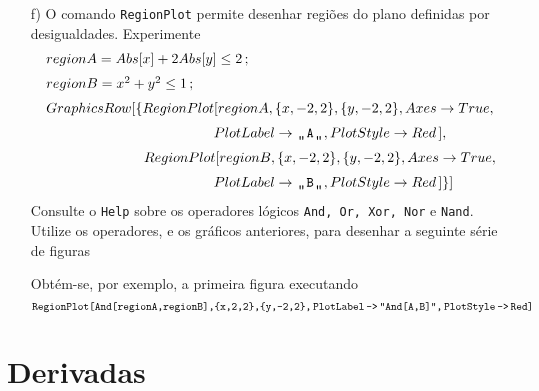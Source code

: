 \documentclass[11pt]{article}
\begin{document}
\begin{itemize}
\item[f)]   O comando \texttt{RegionPlot} permite desenhar regi\~oes do plano definidas por desigualdades. Experimente
 \[\begin{array}{l}
regionA = Abs[x] + 2 Abs[y] \leq 2\,;
\vspace{2mm}\\
regionB = x^2 + y^2 \leq 1\,;\vspace{2mm}\\
GraphicsRow[\{RegionPlot[regionA, \{x, -2, 2\}, \{y, -2, 2\}, Axes \rightarrow True,
    \vspace{2mm}\\ \qquad \qquad \qquad \qquad \qquad \qquad 
    PlotLabel \rightarrow  \texttt{\char"0D}\!\! \texttt{\char"0D}\texttt{A} \texttt{\char"0D}\!\! \texttt{\char"0D}, PlotStyle \rightarrow Red\,],
     \vspace{2mm}\\ \qquad   \qquad \qquad \quad RegionPlot[regionB, \{x, -2, 2\}, \{y, -2, 2\}, Axes \rightarrow True, 
  \vspace{2mm}\\ \qquad \qquad \qquad \qquad \qquad \qquad PlotLabel \rightarrow  \texttt{\char"0D}\!\! \texttt{\char"0D} \texttt{B} \texttt{\char"0D}\!\! \texttt{\char"0D},    PlotStyle \rightarrow Red\,]\}]
 \end{array} \]
  Consulte o \texttt{Help} sobre os operadores l\'ogicos \texttt{And,\,Or,\,Xor,\,Nor} e  \texttt{Nand}.  Utilize os operadores, e os gr\'aficos anteriores, para desenhar a seguinte s\'erie de figuras
 \begin{center}
\end{center}
Obt\'em-se, por exemplo,   a primeira figura executando 
 \[
 \texttt{RegionPlot[And[regionA,regionB],\{x,2,2\},\{y,-2,2\},\,PlotLabel\,->\,"And[A,B]",\,PlotStyle\,->\,Red]}
 \] 

 


\end{itemize}


\section{Derivadas}
\end{document}
